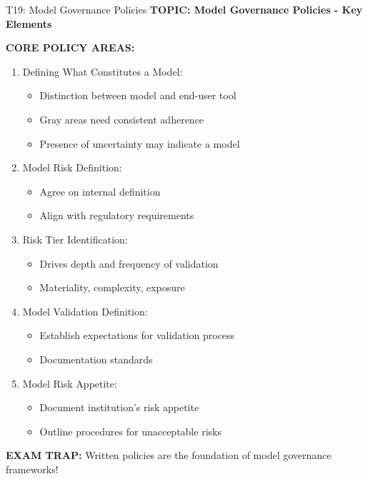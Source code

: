 \documentclass[8pt]{beamer}
\begin{document}
	\begin{frame}{T19: Model Governance Policies}
		\fontsize{6.5}{7.5}\selectfont
		\textbf{TOPIC: Model Governance Policies - Key Elements}
		
		\vspace{0.1cm}
		\textbf{CORE POLICY AREAS:}
		\begin{enumerate}
			\item \textcolor{myblue}{Defining What Constitutes a Model:}
			\begin{itemize}
				\item Distinction between model and end-user tool
				\item Gray areas need consistent adherence
				\item Presence of uncertainty may indicate a model
			\end{itemize}
			\item \textcolor{myblue}{Model Risk Definition:}
			\begin{itemize}
				\item Agree on internal definition
				\item Align with regulatory requirements
			\end{itemize}
			\item \textcolor{myblue}{Risk Tier Identification:}
			\begin{itemize}
				\item Drives depth and frequency of validation
				\item Materiality, complexity, exposure
			\end{itemize}
			\item \textcolor{myblue}{Model Validation Definition:}
			\begin{itemize}
				\item Establish expectations for validation process
				\item Documentation standards
			\end{itemize}
			\item \textcolor{myblue}{Model Risk Appetite:}
			\begin{itemize}
				\item Document institution's risk appetite
				\item Outline procedures for unacceptable risks
			\end{itemize}
		\end{enumerate}
		
		\textcolor{myred}{\textbf{EXAM TRAP:}} Written policies are the \textcolor{myblue}{foundation of model governance frameworks}!
	\end{frame}
	
\end{document}
